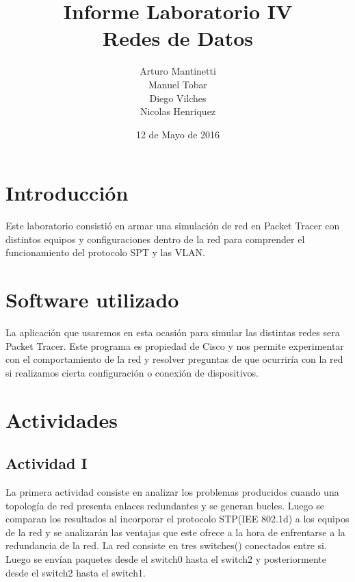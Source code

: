 ﻿\documentclass[spanish]{udpreport}
\title{Informe Laboratorio IV \\ Redes de Datos}
\author{Arturo Mantinetti \\ Manuel Tobar \\ Diego Vilches \\ Nicolas Henriquez}
\date{12 de Mayo de 2016}
\begin{document}
\maketitle

\tableofcontents

\chapter{Introducción}

Este laboratorio consistió en armar una simulación de red en Packet Tracer con distintos equipos y configuraciones dentro de la red para comprender el funcionamiento del protocolo SPT y las VLAN.

\chapter{Software utilizado}
La aplicación que usaremos en esta ocasión para simular las distintas redes sera Packet Tracer. Este programa es propiedad de Cisco y nos permite experimentar con el comportamiento de la red y resolver preguntas de que ocurriría con la red si realizamos cierta configuración o conexión de dispositivos.

\chapter{Actividades}

\section{Actividad I}
La primera actividad consiste en analizar los problemas producidos cuando una topología de red presenta enlaces redundantes y se generan bucles. Luego se comparan los resultados al incorporar el protocolo STP(IEE 802.1d) a los equipos de la red y se analizarán las ventajas que este ofrece a la hora de enfrentarse a la redundancia de la red.
La red consiste en tres switches()  conectados entre si. Luego se envían paquetes desde el switch0 hasta el switch2 y posteriormente desde el switch2 hasta el switch1.
\end{document}
